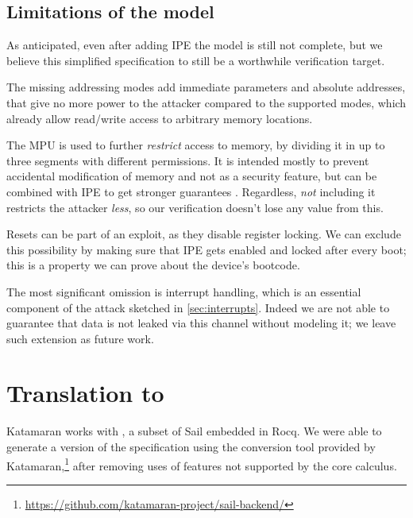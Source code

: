 \subsection{Limitations of the model}
\label{sec:model-limitations}

As anticipated, even after adding IPE the model is still not complete, but we believe this simplified specification to still be a worthwhile verification target.

The missing addressing modes add immediate parameters and absolute addresses, that give no more power to the attacker compared to the supported modes, which already allow read/write access to arbitrary memory locations.

The MPU is used to further \emph{restrict} access to memory, by dividing it in up to three segments with different permissions. It is intended mostly to prevent accidental modification of memory and not as a security feature, but can be combined with IPE to get stronger guarantees \cite{Bognar2024}. Regardless, \emph{not} including it restricts the attacker \emph{less}, so our verification doesn't lose any value from this.

Resets can be part of an exploit, as they disable register locking. We can exclude this possibility by making sure that IPE gets enabled and locked after every boot; this is a property we can prove about the device's bootcode.

The most significant omission is interrupt handling, which is an essential component of the attack sketched in \cref{sec:interrupts}. Indeed we are not able to guarantee that data is not leaked via this channel without modeling it; we leave such extension as future work.

\section{Translation to \texorpdfstring{\usail}{μSail}}

Katamaran works with \usail, a subset of Sail embedded in Rocq. We were able to generate a \usail version of the specification using the conversion tool provided by Katamaran,\footnote{\url{https://github.com/katamaran-project/sail-backend/}} after removing uses of features not supported by the core calculus.

